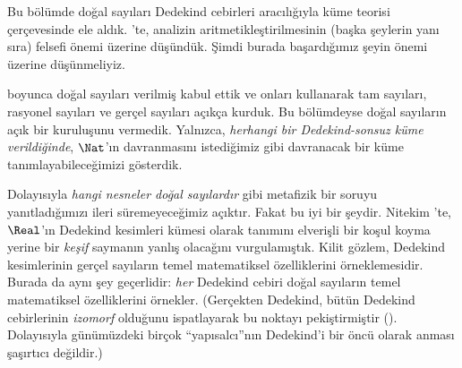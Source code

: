 



Bu bölümde doğal sayıları Dedekind cebirleri aracılığıyla küme teorisi
çerçevesinde ele aldık. 'te, analizin
aritmetikleştirilmesinin (başka şeylerin yanı sıra) felsefi önemi üzerine
düşündük. Şimdi burada başardığımız şeyin önemi üzerine düşünmeliyiz.

 boyunca doğal sayıları verilmiş kabul ettik ve
onları kullanarak tam sayıları, rasyonel sayıları ve gerçel sayıları açıkça
kurduk. Bu bölümdeyse doğal sayıların açık bir kuruluşunu vermedik. Yalnızca,
\emph{herhangi bir Dedekind-sonsuz küme verildiğinde}, $\Nat$'ın davranmasını
istediğimiz gibi davranacak bir küme tanımlayabileceğimizi gösterdik.

Dolayısıyla \emph{hangi nesneler doğal sayılardır} gibi metafizik bir soruyu
yanıtladığımızı ileri süremeyeceğimiz açıktır. Fakat bu iyi bir şeydir.
Nitekim 'te, $\Real$'ın Dedekind kesimleri kümesi
olarak tanımını elverişli bir koşul koyma yerine bir \emph{keşif} saymanın
yanlış olacağını vurgulamıştık. Kilit gözlem, Dedekind kesimlerinin gerçel
sayıların temel matematiksel özelliklerini örneklemesidir. Burada da aynı şey
geçerlidir: \emph{her} Dedekind cebiri doğal sayıların temel matematiksel
özelliklerini örnekler. (Gerçekten Dedekind, bütün Dedekind cebirlerinin
\emph{izomorf} olduğunu ispatlayarak bu noktayı pekiştirmiştir
(\citeyear[Theorems 132--3]{Dedekind1888}). Dolayısıyla günümüzdeki birçok
``yapısalcı''nın Dedekind'i bir öncü olarak anması şaşırtıcı değildir.)

